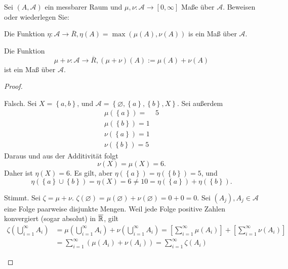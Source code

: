 \begin{Problem}
	Sei $(A,\mathcal{A})$ ein messbarer Raum und $\mu,\nu: \mathcal{A}\to[0,\infty]$ Maße über $\mathcal{A}$. Beweisen oder wiederlegen Sie:
	\begin{parts}
	\item Die Funktion $\eta:\mathcal{A}\to\overline{R},\eta(A)=\max(\mu(A),\nu(A))$ is ein Maß über $\mathcal{A}$.
	\item Die Funktion
		\[
		\mu+\nu:\mathcal{A}\to \overline{R}, \left( \mu+\nu \right)(A):=\mu(A)+\nu(A)
		\]
		ist ein Maß über $\mathcal{A}$.
	\end{parts}
\end{Problem}
\begin{proof}
	\begin{parts}
	\item Falsch. Sei $X=\left\{ a,b \right\} $, und $\mathcal{A}=\left\{ \varnothing, \left\{ a \right\} ,\left\{ b \right\} ,X \right\} $. Sei außerdem
		\begin{align*}
			\mu(\left\{ a \right\} )=&5\\
			\mu\left( \left\{ b \right\}  \right) =1\\
			\nu\left( \left\{ a \right\}  \right) =1\\
			\nu\left( \left\{ b \right\}  \right) =5
		\end{align*}
	Daraus und aus der Additivität folgt
	\[
	\nu(X)=\mu(X)=6
	.\] 
	Daher ist $\eta(X)=6$. Es gilt, aber $\eta(\left\{ a \right\} )=\eta\left( \left\{ b \right\}  \right) =5$, und
	\[
	\eta\left( \left\{ a \right\} \cup \left\{ b \right\}  \right)=\eta(X)=6\neq 10=\eta\left( \left\{ a \right\}  \right) +\eta\left( \left\{ b \right\}   \right)  
	.\] 
\item Stimmt. Sei $\zeta=\mu+\nu$. $\zeta(\varnothing)=\mu(\varnothing)+\nu(\varnothing)=0+0=0$. Sei $(A_j), A_j\in \mathcal{A}$ eine Folge paarweise disjunkte Mengen. Weil jede Folge positive Zahlen konvergiert (sogar absolut) in $\overline{\mathbb{R}}$, gilt
	\begin{align*}
		\zeta\left( \bigcup_{i=1} ^\infty A_i \right) &=\mu\left( \bigcup_{i=1} ^\infty A_i \right) +\nu\left( \bigcup_{i=1} ^\infty A_i \right) =\left[ \sum_{i=1}^{\infty} \mu(A_i) \right] +\left[\sum_{i=1}^{\infty} \nu(A_i)\right]\\
	&=\sum_{i=1}^{\infty} \left( \mu(A_i)+\nu(A_i) \right) =\sum_{i=1}^{\infty} \zeta(A_i)
	\end{align*}
	\end{parts}
\end{proof}
